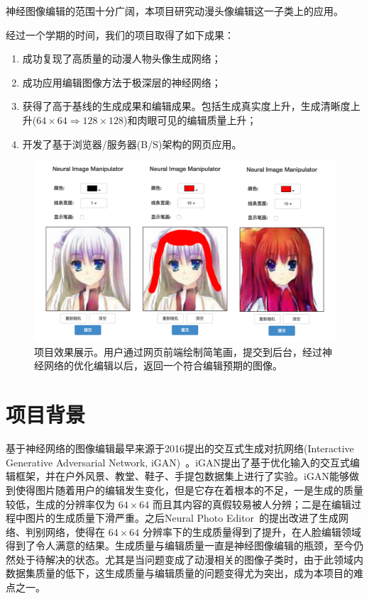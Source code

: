 \documentclass[a4paper,12pt,UTF8]{ctexart}
\newcommand{\kai}{\CJKfamily{zhkai}}	%
\begin{document}

神经图像编辑的范围十分广阔，本项目研究动漫头像编辑这一子类上的应用。

经过一个学期的时间，我们的项目取得了如下成果：

\begin{enumerate}
  \item 成功复现了高质量的动漫人物头像生成网络；
  \item 成功应用编辑图像方法于极深层的神经网络；
  \item 获得了高于基线的生成成果和编辑成果。包括生成真实度上升，生成清晰度上升($64 \times 64 \Rightarrow 128 \times 128$)和肉眼可见的编辑质量上升；
  \item 开发了基于浏览器/服务器(B/S)架构的网页应用。
\end{enumerate}

\begin{figure}[H]
  \centering
  \includegraphics[width=0.9\linewidth]{figs/frontend.png}
  \caption{\kai 项目效果展示。用户通过网页前端绘制简笔画，提交到后台，经过神经网络的优化编辑以后，返回一个符合编辑预期的图像。}
  \label{fig:frontend}
\end{figure}

\section{项目背景}

基于神经网络的图像编辑最早来源于2016提出的交互式生成对抗网络(Interactive Generative Adversarial Network, iGAN)~\cite{Zhu2016Generative}。iGAN提出了基于优化输入的交互式编辑框架，并在户外风景、教堂、鞋子、手提包数据集上进行了实验。iGAN能够做到使得图片随着用户的编辑发生变化，但是它存在着根本的不足，一是生成的质量较低，生成的分辨率仅为 $64\times64$ 而且其内容的真假较易被人分辨；二是在编辑过程中图片的生成质量下滑严重。之后Neural Photo Editor~\cite{Brock2016Neural}的提出改进了生成网络、判别网络，使得在 $64\times64$ 分辨率下的生成质量得到了提升，在人脸编辑领域得到了令人满意的结果。生成质量与编辑质量一直是神经图像编辑的瓶颈，至今仍然处于待解决的状态。尤其是当问题变成了动漫相关的图像子类时，由于此领域内数据集质量的低下，这生成质量与编辑质量的问题变得尤为突出，成为本项目的难点之一。
\end{document}
